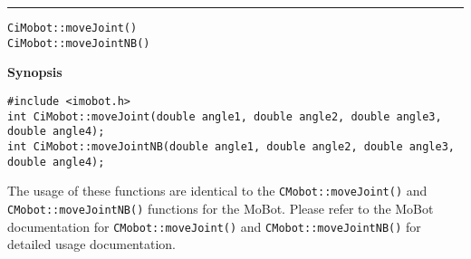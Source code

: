 \noindent
\vspace{5pt}
\rule{6.5in}{0.015in}
\noindent
{\LARGE \texttt{CiMobot::moveJoint()}}\\
{\LARGE \texttt{CiMobot::moveJointNB()}}\\
{}

\noindent
{\bf Synopsis}\\
\begin{verbatim}
#include <imobot.h>
int CiMobot::moveJoint(double angle1, double angle2, double angle3, double angle4);
int CiMobot::moveJointNB(double angle1, double angle2, double angle3, double angle4);
\end{verbatim}

The usage of these functions are identical to the
\texttt{CMobot::moveJoint()} and \texttt{CMobot::moveJointNB()} functions for the MoBot.
Please refer to the MoBot documentation for \texttt{CMobot::moveJoint()} and
\texttt{CMobot::moveJointNB()} for
detailed usage documentation.

